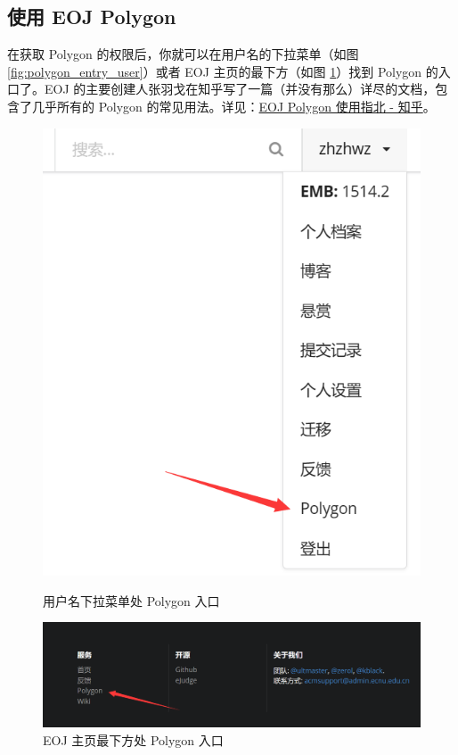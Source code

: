 \documentclass[oneside]{book}
\begin{document}
\subsection{使用 EOJ Polygon}

在获取 Polygon 的权限后，你就可以在用户名的下拉菜单（如图 \ref{fig:polygon_entry_user}）或者 EOJ 主页的最下方（如图 \ref{fig:polygon_entry_main_page}）找到 Polygon 的入口了。EOJ 的主要创建人张羽戈在知乎写了一篇（并没有那么）详尽的文档，包含了几乎所有的 Polygon 的常见用法。详见：\href{https://zhuanlan.zhihu.com/p/59869879}{EOJ Polygon 使用指北 - 知乎}。

\begin{figure}[htbp]
  \centering
  \begin{minipage}{0.28\textwidth}
    \centering
    \includegraphics[width=\textwidth]{res/polygon_entry_user.png}
    \caption{用户名下拉菜单处 Polygon 入口}
    \label{fig:polygon_entry_user}
  \end{minipage}
  \begin{minipage}{0.7\textwidth}
    \centering
    \includegraphics[width=\textwidth]{res/polygon_entry_main_page.png}
    \caption{EOJ 主页最下方处 Polygon 入口}
    \label{fig:polygon_entry_main_page}
  \end{minipage}
\end{figure}
\end{document}
